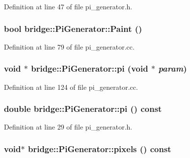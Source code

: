 Definition at line 47 of file pi\_\-generator.h.

\hypertarget{classbridge_1_1_pi_generator_a7d6deb8aca71aa7c3692894f489afd30}{
\subsubsection[{Paint}]{\setlength{\rightskip}{0pt plus 5cm}bool bridge::PiGenerator::Paint ()}}
\label{classbridge_1_1_pi_generator_a7d6deb8aca71aa7c3692894f489afd30}


Definition at line 79 of file pi\_\-generator.cc.

\hypertarget{classbridge_1_1_pi_generator_a869dcf4a6fb5598feece0d4d184caf23}{
\subsubsection[{pi}]{\setlength{\rightskip}{0pt plus 5cm}void $\ast$ bridge::PiGenerator::pi (void $\ast$ {\em param})}}
\label{classbridge_1_1_pi_generator_a869dcf4a6fb5598feece0d4d184caf23}


Definition at line 124 of file pi\_\-generator.cc.

\hypertarget{classbridge_1_1_pi_generator_ac477983021d094e067edb005af305212}{
\subsubsection[{pi}]{\setlength{\rightskip}{0pt plus 5cm}double bridge::PiGenerator::pi () const}}
\label{classbridge_1_1_pi_generator_ac477983021d094e067edb005af305212}


Definition at line 29 of file pi\_\-generator.h.

\hypertarget{classbridge_1_1_pi_generator_a51490d5ee5ac9c1beb10459643f7083a}{
\subsubsection[{pixels}]{\setlength{\rightskip}{0pt plus 5cm}void$\ast$ bridge::PiGenerator::pixels () const}}
\label{classbridge_1_1_pi_generator_a51490d5ee5ac9c1beb10459643f7083a}


